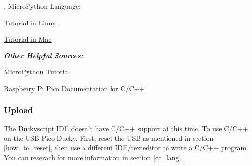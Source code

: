 \documentclass[a4paper,12pt]{article}
\begin{document}
\indent{}. MicroPython Language:
\begin{description}
	\setlength{\itemindent}{3em}
	\item[$\bullet$]\underline{\href{https://circuitdigest.com/microcontroller-projects/getting-started-with-raspberry-pi-pico-with-micropython}{Tutorial in Linux}}
	\item[$\bullet$]\underline{\href{https://desertbot.io/blog/raspberry-pi-pico-setup-mac}{Tutorial in Mac}}
\end{description}

\large
\emph{\textbf{Other Helpful Sources:}}
\normalsize
\begin{description}
	\setlength{\itemindent}{3em}
	\item[$\bullet$] \underline{\href{https://how2electronics.com/raspberry-pi-pico-getting-started-tutorial-with-micropython/}{MicroPython Tutorial}}
	\item[$\bullet$] \underline{\href{https://www.raspberrypi.com/documentation/microcontrollers/c_sdk.html}{Raspberry Pi Pico Documentation for C/C++}}
\end{description}

\subsubsection{Upload}

The Duckyscript IDE doesn't have C/C++ support at this time. To use C/C++ on the USB Pico Ducky. First, reset the USB as mentioned in section \ref{how_to_reset}, then use a different IDE/texteditor to write a C/C++ program. You can reserach for more information in section \ref{cc_lang}.

\newpage
\end{document}
